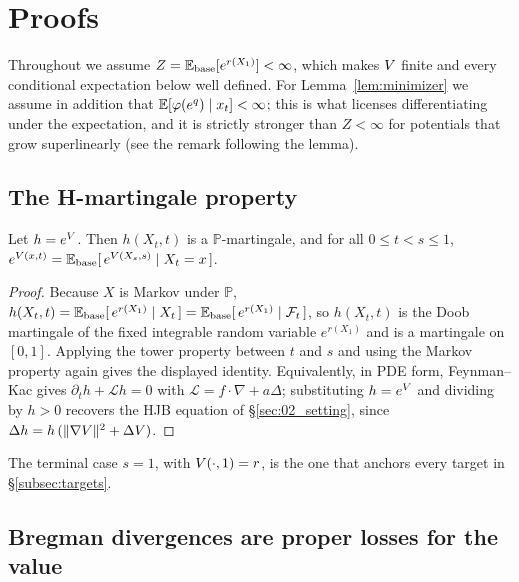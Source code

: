 \section{Proofs}
\label{sec:D_proofs}

Throughout we assume $Z=\mathbb{E}_{\mathrm{base}}[e^{r(X_1)}]<\infty$, which makes $V$
finite and every conditional expectation below well defined. For
Lemma~\ref{lem:minimizer} we assume in addition that
$\mathbb{E}[\varphi(e^{q})\mid x_t]<\infty$; this is what licenses differentiating
under the expectation, and it is strictly stronger than $Z<\infty$ for
potentials that grow superlinearly (see the remark following the lemma).

\subsection{The H-martingale property}

\begin{proposition}
Let $h=e^{V}$. Then $h(X_t,t)$ is a $\mathbb{P}$-martingale, and for all
$0\le t<s\le 1$,
$e^{V(x,t)}=\mathbb{E}_{\mathrm{base}}[\,e^{V(X_s,s)}\mid X_t=x\,]$.
\end{proposition}

\begin{proof}
Because $X$ is Markov under $\mathbb{P}$,
$h(X_t,t)=\mathbb{E}_{\mathrm{base}}[\,e^{r(X_1)}\mid X_t\,]
        =\mathbb{E}_{\mathrm{base}}[\,e^{r(X_1)}\mid\mathcal{F}_t\,]$,
so $h(X_t,t)$ is the Doob martingale of the fixed integrable random variable
$e^{r(X_1)}$ and is a martingale on $[0,1]$. Applying the tower property
between $t$ and $s$ and using the Markov property again gives the displayed
identity. Equivalently, in PDE form, Feynman--Kac gives
$\partial_t h+\mathcal{L}h=0$ with $\mathcal{L}=f\cdot\nabla+a\Delta$;
substituting $h=e^{V}$ and dividing by $h>0$ recovers the HJB equation of
\S\ref{sec:02_setting}, since
$\Delta h = h\,(\|\nabla V\|^{2}+\Delta V)$.
\end{proof}

\noindent The terminal case $s=1$, with $V(\cdot,1)=r$, is the one that
anchors every target in \S\ref{subsec:targets}.

\subsection{Bregman divergences are proper losses for the value}

